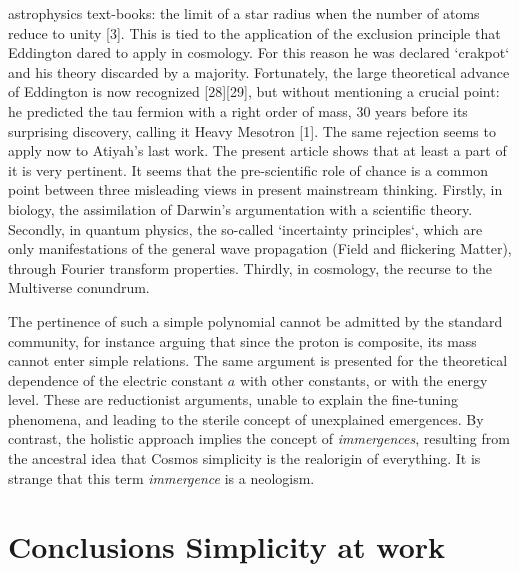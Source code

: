 \documentclass[twoside,draft]{article}
\begin{document}
\begin{sloppypar}
{astrophysics text-books: the limit of a star radius when the number of atoms reduce to unity [3].
This is tied to the application of the exclusion principle that Eddington dared to apply in
cosmology. For this reason he was declared `crakpot` and his theory discarded by a majority.
Fortunately, the large theoretical advance of Eddington is now recognized [28][29], but without
mentioning a crucial point: he predicted the tau fermion with a right order of mass, 30 years before its surprising discovery, calling it Heavy Mesotron [1].
The same rejection seems to apply now to Atiyah's last work. The present article shows that at
least a part of it is very pertinent.
It seems that the pre-scientific role of chance is a common point between three misleading views
in present mainstream thinking. Firstly, in biology, the assimilation of Darwin's argumentation
with a scientific theory. Secondly, in quantum physics, the so-called `incertainty principles`, which are
only manifestations of the general wave propagation (Field and flickering Matter), through Fourier
transform properties. Thirdly, in cosmology, the recurse to the Multiverse conundrum.

The pertinence of such a simple polynomial cannot be admitted by the standard community, for instance arguing that since the proton is composite, its mass cannot enter simple relations. The same argument is presented for the theoretical dependence of the electric constant $a$ with other constants, or with the energy level. These are reductionist arguments, unable to explain the fine-tuning phenomena, and leading to the sterile concept of unexplained emergences. By contrast, the holistic approach implies the concept of \textit{immergences}, resulting from the ancestral idea that Cosmos simplicity is the realorigin of everything. It is strange that this term \textit{immergence} is a neologism. 


\section {Conclusions Simplicity at work}

}
\end{sloppypar}
\end{document}

